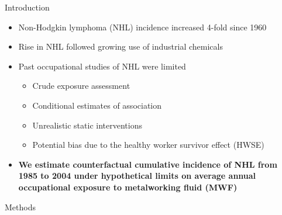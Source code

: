 \documentclass[final]{beamer}
\newlength{\sepwid}
\newlength{\onecolwid}
\begin{document}
\begin{frame}[t] %

\begin{columns}[t,onlytextwidth,totalwidth=\onecolwid]


\begin{column}{\sepwid}\end{column} %

\begin{column}{\onecolwid} %



\begin{block}{Introduction}

\begin{minipage}{\linewidth}\begin{itemize}\setlength{\itemsep}{7pt}
\item Non-Hodgkin lymphoma (NHL) incidence increased 4-fold since 1960 \nocite{Ekstrom-Smedby_2006}
\item Rise in NHL followed growing use of industrial chemicals
\item Past occupational studies of NHL were limited
 	\begin{itemize}\setlength{\itemsep}{7pt}\normalsize
	\item Crude exposure assessment
	\item Conditional estimates of association
	\item Unrealistic static interventions
	\item Potential bias due to the healthy worker survivor effect (HWSE) \nocite{Arrighi_1994}
	\end{itemize}
\item \bfseries We estimate counterfactual cumulative incidence of NHL from 1985 to 2004 under hypothetical limits on average annual occupational exposure to metalworking fluid (MWF)
\end{itemize}
\end{minipage}

\end{block}


\begin{block}{Methods}


\end{block}
\end{column}
\end{columns}
\end{frame}
\end{document}
